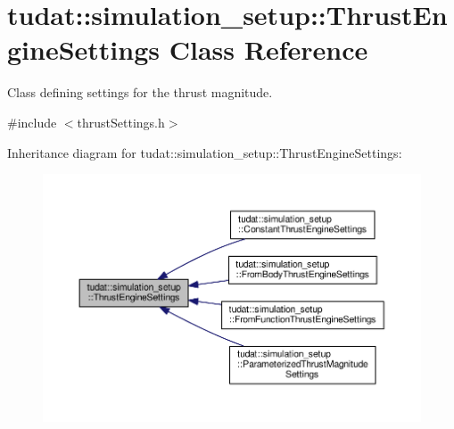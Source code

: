 \hypertarget{classtudat_1_1simulation__setup_1_1ThrustEngineSettings}{}\section{tudat\+:\+:simulation\+\_\+setup\+:\+:Thrust\+Engine\+Settings Class Reference}
\label{classtudat_1_1simulation__setup_1_1ThrustEngineSettings}


Class defining settings for the thrust magnitude.  




{\ttfamily \#include $<$thrust\+Settings.\+h$>$}



Inheritance diagram for tudat\+:\+:simulation\+\_\+setup\+:\+:Thrust\+Engine\+Settings\+:
\nopagebreak
\begin{figure}[H]
\begin{center}
\leavevmode
\includegraphics[width=350pt]{classtudat_1_1simulation__setup_1_1ThrustEngineSettings__inherit__graph}
\end{center}
\end{figure}
